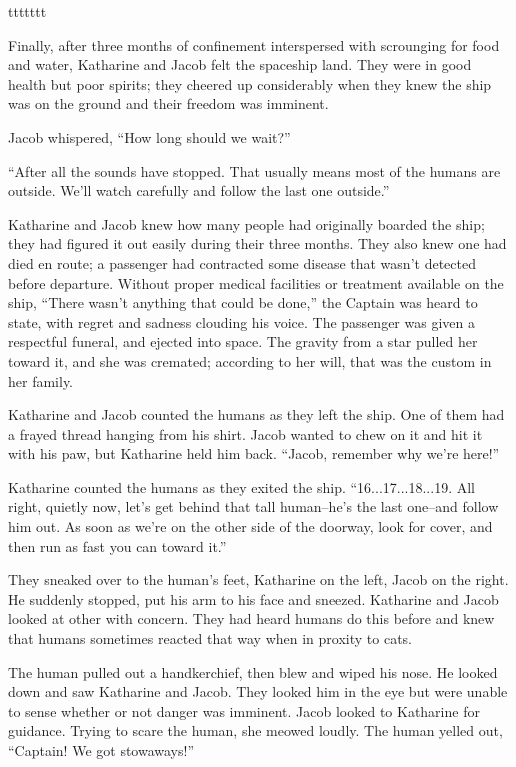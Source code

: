 ttttttt



Finally, after three months of confinement interspersed with scrounging for food and water, Katharine and Jacob felt the spaceship land. They were in good health but poor spirits; they cheered up considerably when they knew the ship was on the ground and their freedom was imminent.

Jacob whispered, “How long should we wait?”

“After all the sounds have stopped. That usually means most of the humans are outside. We'll watch carefully and follow the last one outside.”

Katharine and Jacob knew how many people had originally boarded the ship; they had figured it out easily during their three months. They also knew one had died en route; a passenger had contracted some disease that wasn't detected before departure. Without proper medical facilities or treatment available on the ship, “There wasn't anything that could be done,” the Captain was heard to state, with regret and sadness clouding his voice. The passenger was given a respectful funeral, and ejected into space. The gravity from a star pulled her toward it, and she was cremated; according to her will, that was the custom in her family.

Katharine and Jacob counted the humans as they left the ship. One of them had a frayed thread hanging from his shirt. Jacob wanted to chew on it and hit it with his paw, but Katharine held him back. “Jacob, remember why we're here!”

Katharine counted the humans as they exited the ship. “16...17...18...19. All right, quietly now, let's get behind that tall human–he's the last one–and follow him out. As soon as we're on the other side of the doorway, look for cover, and then run as fast you can toward it.”

They sneaked over to the human's feet, Katharine on the left, Jacob on the right. He suddenly stopped, put his arm to his face and sneezed. Katharine and Jacob looked at other with concern. They had heard humans do this before and knew that humans sometimes reacted that way when in proxity to cats.

The human pulled out a handkerchief, then blew and wiped his nose. He looked down and saw Katharine and Jacob. They looked him in the eye but were unable to sense whether or not danger was imminent. Jacob looked to Katharine for guidance. Trying to scare the human, she meowed loudly. The human yelled out, “Captain! We got stowaways!”

